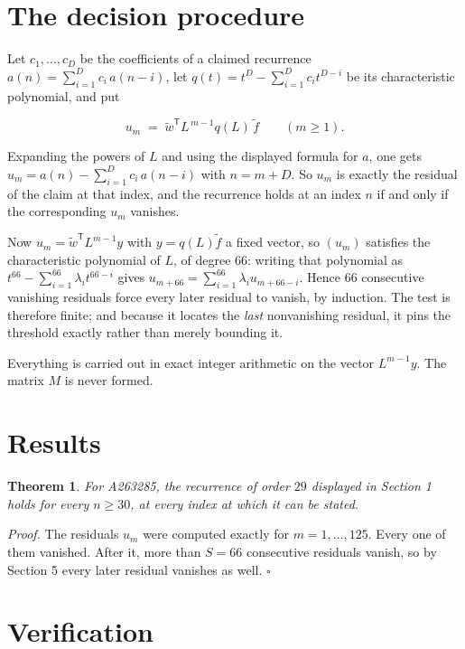 \documentclass[11pt]{article}
\newtheorem{theorem}{Theorem}
\theoremstyle{definition}
\begin{document}
\section{The decision procedure}

Let $c_1,\dots,c_D$ be the coefficients of a claimed recurrence $a(n) = \sum_{i=1}^{D} c_i\,a(n-i)$, let $q(t) = t^{D} - \sum_{i=1}^{D} c_i t^{D-i}$ be its characteristic polynomial, and put

\[u_m \;=\; \tilde w^{\mathsf T} L^{\,m-1} q(L)\,\tilde f \qquad (m \ge 1).\]

Expanding the powers of $L$ and using the displayed formula for $a$, one gets $u_m = a(n) - \sum_{i=1}^{D} c_i\,a(n-i)$ with $n = m + D$. So $u_m$ is exactly the residual of the claim at that index, and the recurrence holds at an index $n$ if and only if the corresponding $u_m$ vanishes.

Now $u_m = \tilde w^{\mathsf T} L^{m-1} y$ with $y = q(L)\tilde f$ a fixed vector, so $(u_m)$ satisfies the characteristic polynomial of $L$, of degree $66$: writing that polynomial as $t^{66} - \sum_{i=1}^{66} \lambda_i t^{66-i}$ gives $u_{m+66} = \sum_{i=1}^{66} \lambda_i u_{m+66-i}$. Hence $66$ consecutive vanishing residuals force every later residual to vanish, by induction. The test is therefore finite; and because it locates the {\itshape last} nonvanishing residual, it pins the threshold exactly rather than merely bounding it.

Everything is carried out in exact integer arithmetic on the vector $L^{m-1}y$. The matrix $M$ is never formed.

\section{Results}

\begin{theorem} For A263285, the recurrence of order $29$ displayed in Section 1 holds for every $n \ge 30$, at every index at which it can be stated.\end{theorem}

{\itshape Proof.} The residuals $u_m$ were computed exactly for $m = 1,\dots,125$. Every one of them vanished. After it, more than $S = 66$ consecutive residuals vanish, so by Section 5 every later residual vanishes as well. $\square$

\section{Verification}
\end{document}
